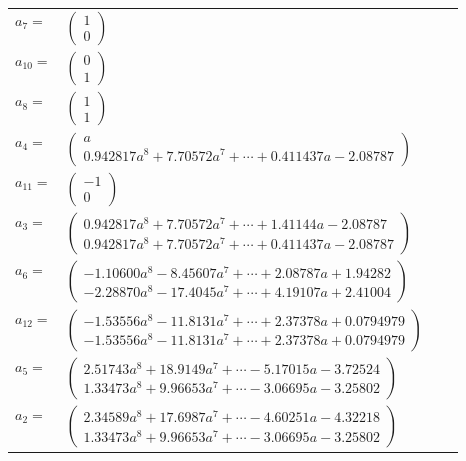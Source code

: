 \documentclass[1p]{elsarticle_modified}
\theoremstyle{definition}
\begin{document}
\begin{tabular}{m{7pt} m{180pt} m{7pt} m{180pt} }
\flushright $a_{7}=$&$\begin{pmatrix}1\\0\end{pmatrix}$ \\
\flushright $a_{10}=$&$\begin{pmatrix}0\\1\end{pmatrix}$ \\
\flushright $a_{8}=$&$\begin{pmatrix}1\\1\end{pmatrix}$ \\
\flushright $a_{4}=$&$\begin{pmatrix}a\\0.942817 a^{8}+7.70572 a^{7}+\cdots+0.411437 a-2.08787\end{pmatrix}$ \\
\flushright $a_{11}=$&$\begin{pmatrix}-1\\0\end{pmatrix}$ \\
\flushright $a_{3}=$&$\begin{pmatrix}0.942817 a^{8}+7.70572 a^{7}+\cdots+1.41144 a-2.08787\\0.942817 a^{8}+7.70572 a^{7}+\cdots+0.411437 a-2.08787\end{pmatrix}$ \\
\flushright $a_{6}=$&$\begin{pmatrix}-1.10600 a^{8}-8.45607 a^{7}+\cdots+2.08787 a+1.94282\\-2.28870 a^{8}-17.4045 a^{7}+\cdots+4.19107 a+2.41004\end{pmatrix}$ \\
\flushright $a_{12}=$&$\begin{pmatrix}-1.53556 a^{8}-11.8131 a^{7}+\cdots+2.37378 a+0.0794979\\-1.53556 a^{8}-11.8131 a^{7}+\cdots+2.37378 a+0.0794979\end{pmatrix}$ \\
\flushright $a_{5}=$&$\begin{pmatrix}2.51743 a^{8}+18.9149 a^{7}+\cdots-5.17015 a-3.72524\\1.33473 a^{8}+9.96653 a^{7}+\cdots-3.06695 a-3.25802\end{pmatrix}$ \\
\flushright $a_{2}=$&$\begin{pmatrix}2.34589 a^{8}+17.6987 a^{7}+\cdots-4.60251 a-4.32218\\1.33473 a^{8}+9.96653 a^{7}+\cdots-3.06695 a-3.25802\end{pmatrix}$ \\

\end{tabular}
\end{document}
